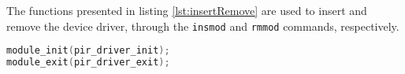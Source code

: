 The functions presented in listing \ref{lst:insertRemove} are used to insert and remove the device driver, through the \verb|insmod| and \verb|rmmod| commands, respectively.

\begin{lstlisting}[language=C, caption={Device Driver insert and remove functions.}, label={lst:insertRemove}]
module_init(pir_driver_init);
module_exit(pir_driver_exit);
\end{lstlisting}


%
